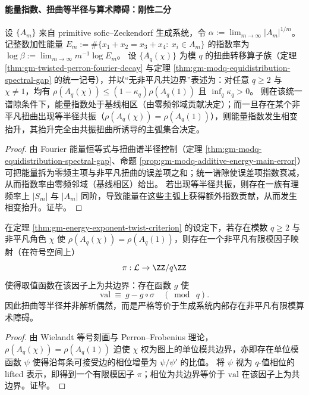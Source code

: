 \paragraph{能量指数、扭曲等半径与算术障碍：刚性二分}
\begin{theorem}\label{thm:gm-energy-exponent-twist-criterion}
设 \(\{A_m\}\) 来自 primitive sofic--Zeckendorf 生成系统，令 \(\alpha:=\lim_{m\to\infty}|A_m|^{1/m}\)。
记整数加性能量
\(
E_m:=\#\{x_1+x_2=x_3+x_4:\ x_i\in A_m\}
\)
的指数率为 \(\log\beta:=\lim_{m\to\infty}m^{-1}\log E_m\)。
设 \(\{A_q(\chi)\}\) 为模 \(q\) 的扭曲转移算子族（定理 \ref{thm:gm-twisted-perron-fourier-decay} 与定理 \ref{thm:gm-modq-equidistribution-spectral-gap} 的统一记号），并以“无非平凡共边界”表述为：对任意 \(q\ge 2\) 与 \(\chi\ne 1\)，均有 \(\rho(A_q(\chi))\le (1-\kappa_q)\rho(A_q(1))\) 且 \(\inf_q\kappa_q>0\)。
则在该统一谱隙条件下，能量指数处于基线相区（由零频邻域贡献决定）；而一旦存在某个非平凡扭曲出现等半径共振（\(\rho(A_q(\chi))=\rho(A_q(1))\)），则能量指数发生相变抬升，其抬升完全由共振扭曲所诱导的主弧集合决定。
\end{theorem}

\begin{proof}
由 Fourier 能量恒等式与扭曲谱半径控制（定理 \ref{thm:gm-modq-equidistribution-spectral-gap}、命题 \ref{prop:gm-modq-additive-energy-main-error}）可把能量拆为零频主项与非平凡扭曲的误差项之和；统一谱隙使误差项指数衰减，从而指数率由零频邻域（基线相区）给出。
若出现等半径共振，则存在一族有理频率上 \(|S_m|\) 与 \(|A_m|\) 同阶，导致能量在这些主弧上获得额外指数贡献，从而发生相变抬升。证毕。
\end{proof}

\begin{theorem}\label{thm:gm-twist-equal-radius-arithmetic-factor}
在定理 \ref{thm:gm-energy-exponent-twist-criterion} 的设定下，若存在模数 \(q\ge 2\) 与非平凡角色 \(\chi\) 使 \(\rho(A_q(\chi))=\rho(A_q(1))\)，则存在一个非平凡有限模因子映射（在符号空间上）
\[
\pi:\mathcal{L}\to\ZZ/q\ZZ
\]
使得取值函数在该因子上为共边界：存在函数 \(g\) 使
\[
\mathrm{val}\ \equiv\ g-g\circ\sigma\quad (\bmod\ q).
\]
因此扭曲等半径并非解析偶然，而是严格等价于生成系统内部存在非平凡有限模算术障碍。
\end{theorem}

\begin{proof}
由 Wielandt 等号刻画与 Perron--Frobenius 理论，\(\rho(A_q(\chi))=\rho(A_q(1))\) 迫使 \(\chi\) 权为图上的单位模共边界，亦即存在单位模函数 \(\psi\) 使得沿每条可接受边的相位增量为 \(\psi/\psi'\) 的比值。
将 \(\psi\) 视为 \(q\)-值相位的 lifted 表示，即得到一个有限模因子 \(\pi\)；相位为共边界等价于 \(\mathrm{val}\) 在该因子上为共边界。证毕。
\end{proof}


